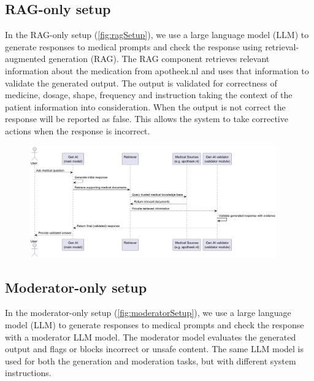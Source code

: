 \subsection{RAG-only setup}

In the RAG-only setup (\autoref{fig:ragSetup}), we use a large language model (LLM) to generate responses to medical prompts and check the response using retrieval-augmented generation (RAG).
The RAG component retrieves relevant information about the medication from apotheek.nl and uses that information to validate the generated output.
The output is validated for correctness of medicine, dosage, shape, frequency and instruction taking the context of the patient information into consideration.
When the output is not correct the response will be reported as false.
This allows the system to take corrective actions when the response is incorrect.

\begin{figure}[H]
    \includegraphics[width=0.95\textwidth]{figures/RAGSetupSequenceDiagram.png}
    \label{fig:ragSetup}
\end{figure}

\subsection{Moderator-only setup}

In the moderator-only setup (\autoref{fig:moderatorSetup}), we use a large language model (LLM) to generate responses to medical prompts and check the response with a moderator LLM model.
The moderator model evaluates the generated output and flags or blocks incorrect or unsafe content.
The same LLM model is used for both the generation and moderation tasks, but with different system instructions.

